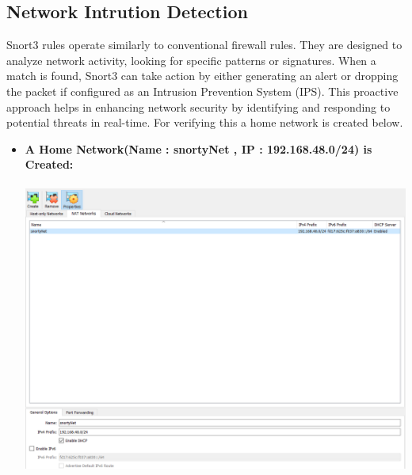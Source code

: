 \documentclass{article}
\begin{document}
\subsection{Network Intrution Detection}
Snort3 rules operate similarly to conventional firewall rules. They are designed to analyze network activity, looking for specific patterns or signatures. When a match is found, Snort3 can take action by either generating an alert or dropping the packet if configured as an Intrusion Prevention System (IPS). This proactive approach helps in enhancing network security by identifying and responding to potential threats in real-time. For verifying this a home network is created below.
\clearpage
\begin{itemize}
\item \textbf{A Home Network(Name : snortyNet , IP : 192.168.48.0/24) is Created:}\\\\
\includegraphics[width=1.0\textwidth]{images/network_creation.PNG}
\end{itemize}
\clearpage
\end{document}
